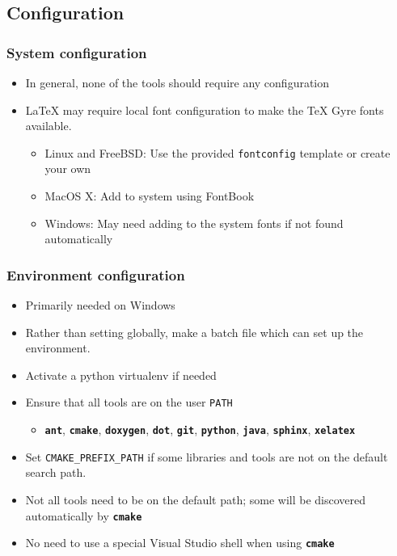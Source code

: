 \documentclass{beamer}
\newcommand{\cmd}[1]{\textbf{\texttt{#1}}}
\newcommand{\pkg}[1]{\texttt{#1}}
\begin{document}
\subsection{Configuration}

\begin{frame}
  \frametitle{System configuration}
  \begin{itemize}
    \item In general, none of the tools should require any configuration
      \item \LaTeX{} may require local font configuration to make the \TeX{} Gyre fonts available.
        \begin{itemize}
          \item Linux and FreeBSD: Use the provided \pkg{fontconfig}
            template or create your own
          \item MacOS X: Add to system using FontBook
          \item Windows: May need adding to the system fonts if not
            found automatically
        \end{itemize}
  \end{itemize}
\end{frame}

\begin{frame}
  \frametitle{Environment configuration}
  \begin{itemize}
    \item Primarily needed on Windows
    \item Rather than setting globally, make a batch file which can set up the environment.
    \item Activate a python virtualenv if needed
    \item Ensure that all tools are on the user \texttt{PATH}
      \begin{itemize}
        \item \cmd{ant}, \cmd{cmake}, \cmd{doxygen}, \cmd{dot}, \cmd{git}, \cmd{python}, \cmd{java}, \cmd{sphinx}, \cmd{xelatex}
      \end{itemize}
    \item Set \texttt{CMAKE\_PREFIX\_PATH} if some libraries and tools are not on the default search path.
    \item Not all tools need to be on the default path; some will be discovered automatically by \cmd{cmake}
    \item No need to use a special Visual Studio shell when using \cmd{cmake}
  \end{itemize}
\end{frame}
\end{document}
